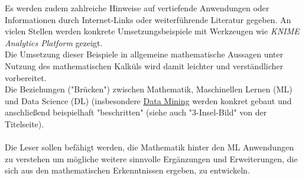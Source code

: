 \documentclass[12pt]{article}
\begin{document}
Es werden zudem zahlreiche Hinweise auf vertiefende Anwendungen oder Informationen durch Internet-Links oder weiterführende Literatur gegeben. An vielen Stellen werden konkrete Umsetzungsbeispiele mit Werkzeugen wie \textit{KNIME Analytics Platform} gezeigt. \\
Die Umsetzung dieser Beispiele in allgemeine mathematische Aussagen unter  Nutzung des mathematischen Kalküls wird damit leichter und verständlicher vorbereitet.\\[0.2cm]
%
Die Beziehungen ("Brücken") zwischen Mathematik, Maschinellen Lernen (ML) und Data Science (DL) (insbesondere \href{https://en.wikipedia.org/wiki/Data_mining}{Data Mining} werden konkret gebaut und anschließend beispielhaft "beschritten" (siehe auch "3-Insel-Bild" von der Titelseite).\\\\[0.3cm] 
%
Die Leser sollen befähigt werden, die Mathematik hinter den ML Anwendungen zu verstehen um mögliche weitere sinnvolle Ergänzungen und Erweiterungen, die sich aus den mathematischen Erkenntnissen ergeben, zu entwickeln.\\
\end{document}
